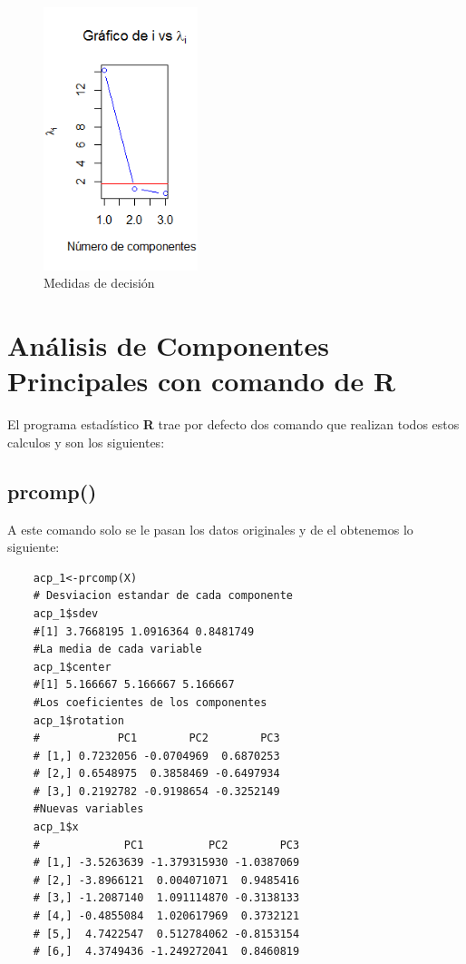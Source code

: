 \documentclass[12pt,letterpaper]{report} %
\begin{document}
\begin{itemize}
	\begin{figure}
		\caption{Medidas de decisión}
		\centering
		\includegraphics[width=0.4\textwidth]{img/Rplot2.png}
	\end{figure}
		
\end{itemize}

\section{Análisis de Componentes Principales con comando de R}

El programa estadístico \textbf{R} trae por defecto dos comando que realizan todos estos calculos y son los siguientes:

\subsection{prcomp()}

A este comando solo se le pasan los datos originales y de el obtenemos lo siguiente:

	\begin{lstlisting}
	acp_1<-prcomp(X)
	# Desviacion estandar de cada componente
	acp_1$sdev
	#[1] 3.7668195 1.0916364 0.8481749
	#La media de cada variable
	acp_1$center
	#[1] 5.166667 5.166667 5.166667
	#Los coeficientes de los componentes
	acp_1$rotation
	#            PC1        PC2        PC3
	# [1,] 0.7232056 -0.0704969  0.6870253
	# [2,] 0.6548975  0.3858469 -0.6497934
	# [3,] 0.2192782 -0.9198654 -0.3252149
	#Nuevas variables
	acp_1$x
	#             PC1          PC2        PC3
	# [1,] -3.5263639 -1.379315930 -1.0387069
	# [2,] -3.8966121  0.004071071  0.9485416
	# [3,] -1.2087140  1.091114870 -0.3138133
	# [4,] -0.4855084  1.020617969  0.3732121
	# [5,]  4.7422547  0.512784062 -0.8153154
	# [6,]  4.3749436 -1.249272041  0.8460819
	\end{lstlisting}
	
\end{document}
